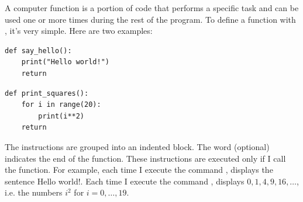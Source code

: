 \documentclass[11pt,class=report,crop=false]{standalone}
\begin{document}




\begin{cours}


A computer function is a portion of code that performs a specific task and can be used one or more times during the rest of the program. 
To define a function with \Python{}, it's very simple. 
Here are two examples:
\begin{center}
\begin{minipage}{0.4\textwidth}
\begin{lstlisting}
def say_hello():
    print("Hello world!")
    return
\end{lstlisting}
\end{minipage}\qquad\qquad
\begin{minipage}{0.4\textwidth}
\begin{lstlisting}
def print_squares():
    for i in range(20):
        print(i**2)
    return
\end{lstlisting}
\end{minipage}
\end{center}


The instructions are grouped into an indented block. The word  (optional) indicates the end of the function. These instructions are executed only if I call the function. For example, each time I execute the command , \Python{} displays the sentence \og{}Hello world!\fg{}. Each time I execute the command , \Python{} displays $0,1,4,9,16,\ldots$, i.e. the numbers $i^2$ for $i=0,\ldots,19$.



\end{cours}
\end{document}
